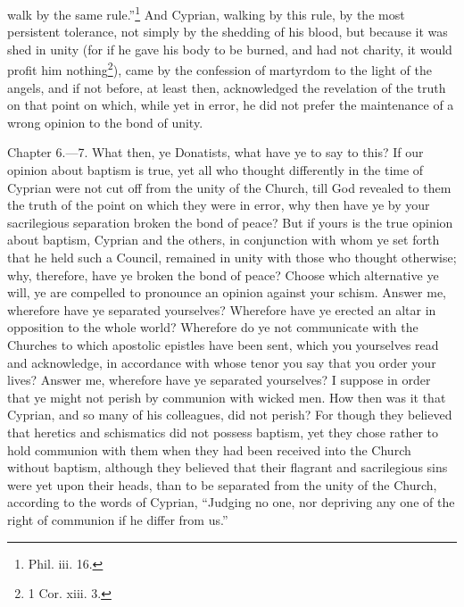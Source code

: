 walk by the same rule.''\footnote{\par  Phil. iii. 16.} And Cyprian, walking by this rule, by the most persistent tolerance, not simply by the shedding of his blood, but because it was shed in unity (for if he gave his body to be burned, and had not charity, it would profit him nothing\footnote{\par  1 Cor. xiii. 3.}), came by the confession of martyrdom to the light of the angels, and if not before, at least then, acknowledged the revelation of the truth on that point on which, while yet in error, he did not prefer the maintenance of a wrong opinion to the bond of unity.


Chapter 6.—7. What then, ye Donatists, what have ye to say to this? If our opinion about baptism is true, yet all who thought differently in the time of Cyprian were not cut off from the unity of the Church, till God revealed to them the truth of the point on which they were in error, why then have ye by your sacrilegious separation broken the bond of peace? But if yours is the true opinion about baptism, Cyprian and the others, in conjunction with whom ye set forth that he held such a Council, remained in unity with those who thought otherwise; why, therefore, have ye broken the bond of peace? Choose which alternative ye will, ye are compelled to pronounce an opinion against your schism. Answer me, wherefore have ye separated yourselves? Wherefore have ye erected an altar in opposition to the whole world? Wherefore do ye not communicate with the Churches to which apostolic epistles have been sent, which you yourselves read and acknowledge, in accordance with whose tenor you say that you order your lives? Answer me, wherefore have ye separated yourselves? I suppose in order that ye might not perish by communion with wicked men. How then was it that Cyprian, and so many of his colleagues, did not perish? For though they believed that heretics and schismatics did not possess baptism, yet they chose rather to hold communion with them when they had been received into the Church without baptism, although they believed that their flagrant and sacrilegious sins were yet upon their heads, than to be separated from the unity of the Church, according to the words of Cyprian, ``Judging no one, nor depriving any one of the right of communion if he differ from us.''

